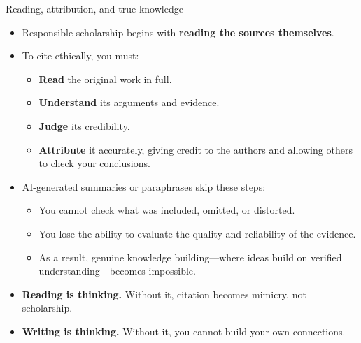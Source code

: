 \documentclass[aspectratio=169]{beamer}
\begin{document}
\begin{frame}{Reading, attribution, and true knowledge}
\begin{itemize}
  \item Responsible scholarship begins with \textbf{reading the sources themselves}.  
  \item To cite ethically, you must:
    \begin{itemize}
      \item \textbf{Read} the original work in full.  
      \item \textbf{Understand} its arguments and evidence.
      \item \textbf{Judge} its credibility.  
      \item \textbf{Attribute} it accurately, giving credit to the authors and allowing others to check your conclusions.  
    \end{itemize}
  \item AI-generated summaries or paraphrases skip these steps:
    \begin{itemize}
      \item You cannot check what was included, omitted, or distorted.  
      \item You lose the ability to evaluate the quality and reliability of the evidence.  
      \item As a result, genuine knowledge building—where ideas build on verified understanding—becomes impossible.
    \end{itemize}
  \item \textbf{Reading is thinking.} Without it, citation becomes mimicry, not scholarship.
  \item \textbf{Writing is thinking.} Without it, you cannot build your own connections.
\end{itemize}
\end{frame}
\end{document}
